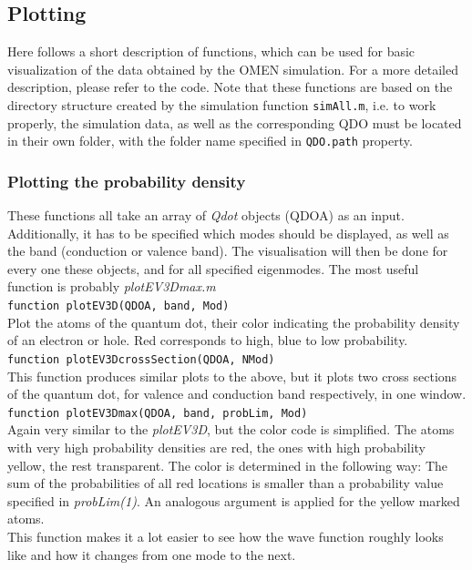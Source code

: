 		\subsection{Plotting} \label{sec:plotting}
			Here follows a short description of functions, which can be used for basic visualization of the data obtained by the OMEN simulation. 
			For a more detailed description, please refer to the code.
			Note that these functions are based on the directory structure created by the simulation function \lstinline{simAll.m}, i.e. to work properly, the simulation data, 
			as well as the corresponding \gls{QDO} must be located in their own folder, with the folder name specified in \lstinline{QDO.path} property.
			
			\subsubsection{Plotting the probability density}
			These functions all take an array of \textit{Qdot} objects (QDOA) as an input. Additionally, it has to be specified which modes should be displayed, as well as the band (conduction or valence band). The visualisation will then be done for every one these objects, and for all specified eigenmodes. The most useful function is probably \textit{plotEV3Dmax.m}\\
			
			\lstinline{function plotEV3D(QDOA, band, Mod) }\\
			
			Plot the atoms of the quantum dot, their color indicating the probability density of an electron or hole. Red corresponds to high, blue to low probability.\\
			
			\lstinline{function plotEV3DcrossSection(QDOA, NMod) }\\
			
			This function produces similar plots to the above, but it plots two cross sections of the quantum dot, for valence and conduction band respectively, 
			in one window.\\
			
			\lstinline{function plotEV3Dmax(QDOA, band, probLim, Mod)}\\
			
			Again very similar to the \textit{plotEV3D}, but the color code is simplified. The atoms with very high probability densities are red, the ones with high probability yellow, the rest transparent. The color is determined in the following way: The sum of the probabilities of all red locations is smaller than a probability value specified in \textit{probLim(1)}. An analogous argument is applied for the yellow marked atoms.\\
			This function makes it a lot easier to see how the wave function roughly looks like and how it changes from one mode to the next.\\
			

